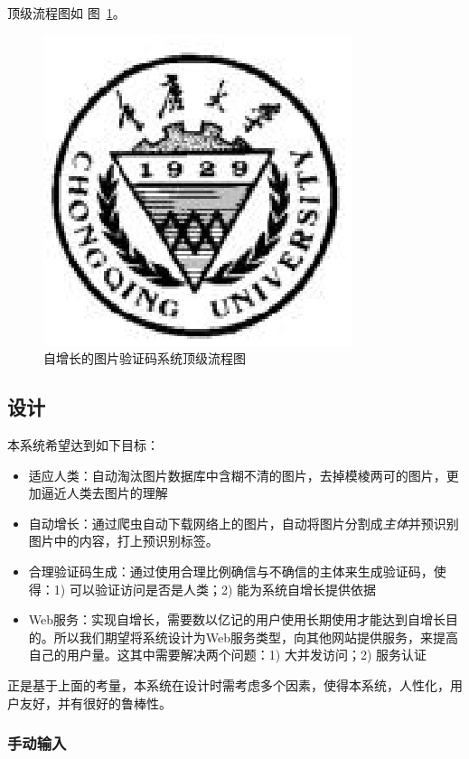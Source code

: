 \documentclass[bachelor,zhspacing]{cqu}  %
\def\tightlist{}
\begin{document}
顶级流程图如 图~\ref{fig:flow}。

\begin{figure}[htbp]
\centering
\includegraphics{pic/cqu.eps}
\caption{自增长的图片验证码系统顶级流程图}\label{fig:flow}
\end{figure}

\subsection{设计}\label{ux8bbeux8ba1}

本系统希望达到如下目标：

\begin{itemize}
\tightlist
\item
  适应人类：自动淘汰图片数据库中含糊不清的图片，去掉模棱两可的图片，更加逼近人类去图片的理解
\item
  自动增长：通过爬虫自动下载网络上的图片，自动将图片分割成\emph{主体}并预识别图片中的内容，打上预识别标签。
\item
  合理验证码生成：通过使用合理比例确信与不确信的主体来生成验证码，使得：1)
  可以验证访问是否是人类；2) 能为系统自增长提供依据
\item
  Web服务：实现自增长，需要数以亿记的用户使用长期使用才能达到自增长目的。所以我们期望将系统设计为Web服务类型，向其他网站提供服务，来提高自己的用户量。这其中需要解决两个问题：1)
  大并发访问；2) 服务认证
\end{itemize}

正是基于上面的考量，本系统在设计时需考虑多个因素，使得本系统，人性化，用户友好，并有很好的鲁棒性。

\subsubsection{手动输入}\label{ux624bux52a8ux8f93ux5165}
\end{document}
